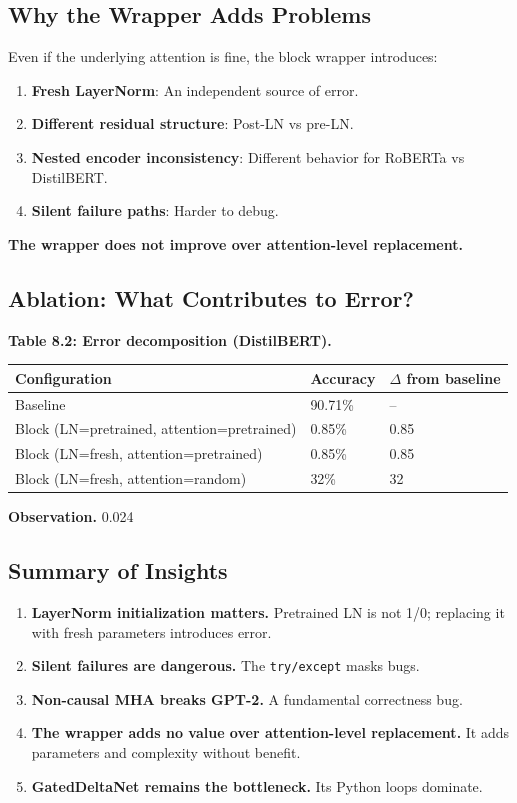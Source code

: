 \subsection{Why the Wrapper Adds Problems}

Even if the underlying attention is fine, the block wrapper introduces:

\begin{enumerate}
\item \textbf{Fresh LayerNorm}: An independent source of error.
\item \textbf{Different residual structure}: Post-LN vs pre-LN.
\item \textbf{Nested encoder inconsistency}: Different behavior for RoBERTa vs DistilBERT.
\item \textbf{Silent failure paths}: Harder to debug.

\end{enumerate}
\textbf{The wrapper does not improve over attention-level replacement.}

\subsection{Ablation: What Contributes to Error?}

\textbf{Table 8.2: Error decomposition (DistilBERT).}

\begin{table}[H]
\centering
\small
\begin{tabular}{lll}
\toprule
\textbf{Configuration} & \textbf{Accuracy} & \textbf{$\Delta$ from baseline} \\
\midrule
Baseline & 90.71\% & -- \\
Block (LN=pretrained, attention=pretrained) & 0.85\% & 0.85 \\
Block (LN=fresh, attention=pretrained) & 0.85\% & 0.85 \\
Block (LN=fresh, attention=random) & 32\% & 32 \\
\bottomrule
\end{tabular}
\end{table}

\textbf{Observation.} 0.024

\subsection{Summary of Insights}

\begin{enumerate}
\item \textbf{LayerNorm initialization matters.} Pretrained LN is not 1/0; replacing
  it with fresh parameters introduces error.
\item \textbf{Silent failures are dangerous.} The \texttt{try/except} masks bugs.
\item \textbf{Non-causal MHA breaks GPT-2.} A fundamental correctness bug.
\item \textbf{The wrapper adds no value over attention-level replacement.} It adds
  parameters and complexity without benefit.
\item \textbf{GatedDeltaNet remains the bottleneck.} Its Python loops dominate.

\end{enumerate}


